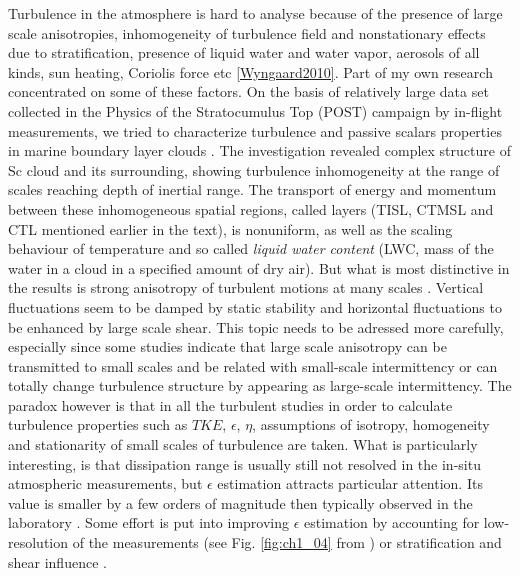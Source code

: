 \documentclass[../main.tex]{subfiles}
\begin{document}
Turbulence in the atmosphere is hard to analyse because of the presence of large scale anisotropies, inhomogeneity of turbulence field and nonstationary effects due to stratification, presence of liquid water and water vapor, aerosols of all kinds, sun heating, Coriolis force etc \ref{Wyngaard2010}. Part of my own research concentrated on some of these factors. On the basis of relatively large data set collected in the Physics of the Stratocumulus Top (POST) campaign by in-flight measurements, we tried to characterize turbulence and passive scalars properties in marine boundary layer clouds \citep{Jen-LaPlante2016, Ma2017}. The investigation revealed complex structure of Sc cloud and its surrounding, showing turbulence inhomogeneity at the range of scales reaching depth of inertial range. The transport of energy and momentum between these inhomogeneous spatial regions, called layers (TISL, CTMSL and CTL mentioned earlier in the text), is nonuniform, as well as the scaling behaviour of temperature and so called \emph{liquid water content} (LWC, mass of the water in a cloud in a specified amount of dry air). But what is most distinctive in the results is strong anisotropy of turbulent motions at many scales \citep{Pedersen2018}. Vertical fluctuations seem to be damped by static stability and horizontal fluctuations to be enhanced by large scale shear. This topic needs to be adressed more carefully, especially since some studies indicate that large scale anisotropy can be transmitted to small scales and be related with small-scale intermittency \citep{Warhaft2002} or can totally change turbulence structure by appearing as large-scale intermittency\citep{Takahashi2018}. The paradox however is that in all the turbulent studies in order to calculate turbulence properties such as $TKE$, $\epsilon$, $\eta$, assumptions of isotropy, homogeneity and stationarity of small scales of turbulence are taken. What is particularly interesting, is that dissipation range is usually still not resolved in the in-situ atmospheric measurements, but $\epsilon$ estimation attracts particular attention. Its value is smaller by a few orders of magnitude then typically observed in the laboratory \citep{Siebert2009, Jen-LaPlante2016}. Some effort is put into improving $\epsilon$ estimation by accounting for low-resolution of the measurements (see Fig. \ref{fig:ch1_04} from \citet{Waclawczyk2017}) or stratification and shear influence \citep{Zilitinkevich2019}. \\
\end{document}
